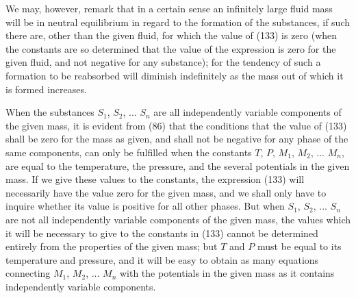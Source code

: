 \documentclass[12pt]{article}
\begin{document}
We may, however, remark that in a certain sense an infinitely large fluid mass will be in neutral equilibrium in regard to the formation of the substances, if such there are, other than the given fluid, for which the value of (133) is zero (when the constants are so determined that the value of the expression is zero for the given fluid, and not negative for any substance); for the tendency of such a formation to be reabsorbed will diminish indefinitely as the mass out of which it is formed increases.


When the substances $S_1$, $S_2$, ... $S_n$ are all independently variable components of the given mass, it is evident from (86) that the conditions that the value of (133) shall be zero for the mass as given, and shall not be negative for any phase of the same components, can only be fulfilled when the constants $T$, $P$, $M_1$, $M_2$, ... $M_n$, are equal to the temperature, the pressure, and the several potentials in the given mass. If we give these values to the constants, the expression (133) will necessarily have the value zero for the given mass, and we shall only have to inquire whether its value is positive for all other phases. But when $S_1$, $S_2$, ... $S_n$ are not all independently variable components of the given mass, the values which it will be necessary to give to the constants in (133) cannot be determined entirely from the properties of the given mass; but $T$ and $P$ must be equal to its temperature and pressure, and it will be easy to obtain as many equations connecting $M_1$, $M_2$, ... $M_n$ with the potentials in the given mass as it contains independently variable components.
\end{document}
